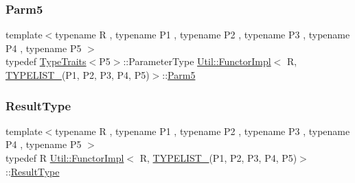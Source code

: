 \mbox{\label{classUtil_1_1FunctorImpl_3_01R_00_01TYPELIST__5_07P1_00_01P2_00_01P3_00_01P4_00_01P5_08_4_a465c4b811dcbcfecb64048b28429c6ab}} 
\subsubsection{\texorpdfstring{Parm5}{Parm5}\hspace{0.1cm}{\footnotesize\ttfamily [3/3]}}
{\footnotesize\ttfamily template$<$typename R , typename P1 , typename P2 , typename P3 , typename P4 , typename P5 $>$ \\
typedef \mbox{\hyperlink{classUtil_1_1TypeTraits}{Type\+Traits}}$<$P5$>$\+::Parameter\+Type \mbox{\hyperlink{classUtil_1_1FunctorImpl}{Util\+::\+Functor\+Impl}}$<$ R, \mbox{\hyperlink{adat__devel__install_2include_2adat_2typelist_8h_aad5d9b3c82c8503c85c625acd41c0a2f}{T\+Y\+P\+E\+L\+I\+S\+T\+\_}}(P1, P2, P3, P4, P5)$>$\+::\mbox{\hyperlink{structUtil_1_1Private_1_1FunctorImplBase_ac5b1d132e854e4f9fd6fb1e43313fa26}{Parm5}}}

\mbox{\label{classUtil_1_1FunctorImpl_3_01R_00_01TYPELIST__5_07P1_00_01P2_00_01P3_00_01P4_00_01P5_08_4_ad1b291756f0f94ecde300b4a2ea9ce14}} 
\subsubsection{\texorpdfstring{ResultType}{ResultType}\hspace{0.1cm}{\footnotesize\ttfamily [1/3]}}
{\footnotesize\ttfamily template$<$typename R , typename P1 , typename P2 , typename P3 , typename P4 , typename P5 $>$ \\
typedef R \mbox{\hyperlink{classUtil_1_1FunctorImpl}{Util\+::\+Functor\+Impl}}$<$ R, \mbox{\hyperlink{adat__devel__install_2include_2adat_2typelist_8h_aad5d9b3c82c8503c85c625acd41c0a2f}{T\+Y\+P\+E\+L\+I\+S\+T\+\_}}(P1, P2, P3, P4, P5)$>$\+::\mbox{\hyperlink{structUtil_1_1Private_1_1FunctorImplBase_a5e95fd30fdd89f3c5080b68ab5891bc3}{Result\+Type}}}

